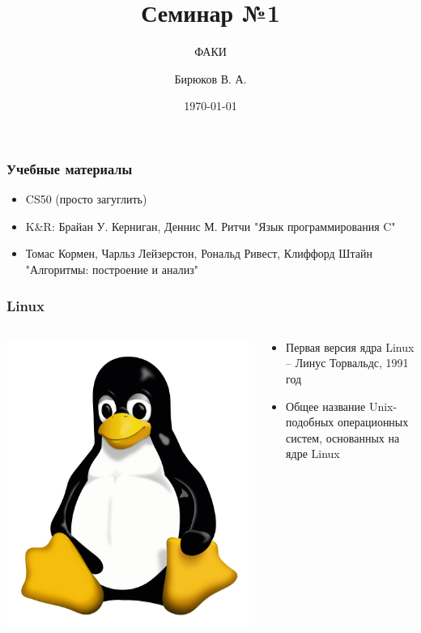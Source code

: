\documentclass[12pt,pdf,hyperref={unicode}]{beamer}
\title{Семинар №1}
\subtitle{ФАКИ \the\year}
\author{Бирюков В. А.}
\date{\today}
\begin{document}
\begin{frame}
\titlepage
\end{frame} 

\begin{frame}
\frametitle{Учебные материалы} 
    \begin{itemize}
    \item CS50 (просто загуглить)
    \item K\&R: Брайан У. Керниган, Деннис М. Ритчи "Язык программирования C"
    \item Томас Кормен, Чарльз Лейзерстон, Рональд Ривест, Клиффорд Штайн "Алгоритмы: построение и анализ"
    \end{itemize}
\end{frame}


\begin{frame}
\frametitle{Linux} 
\begin{columns}
\begin{column}{0.4\textwidth}
   \includegraphics[width=0.75\linewidth]{tux.png}
\end{column}
\begin{column}{0.6\textwidth}  %
    \begin{itemize}
    \item Первая версия ядра Linux -- Линус Торвальдс, 1991 год
    \item Общее название Unix-подобных операционных систем, основанных на ядре Linux
    
    \end{itemize}
\end{column}
\end{columns}


\end{frame}
\end{document}

